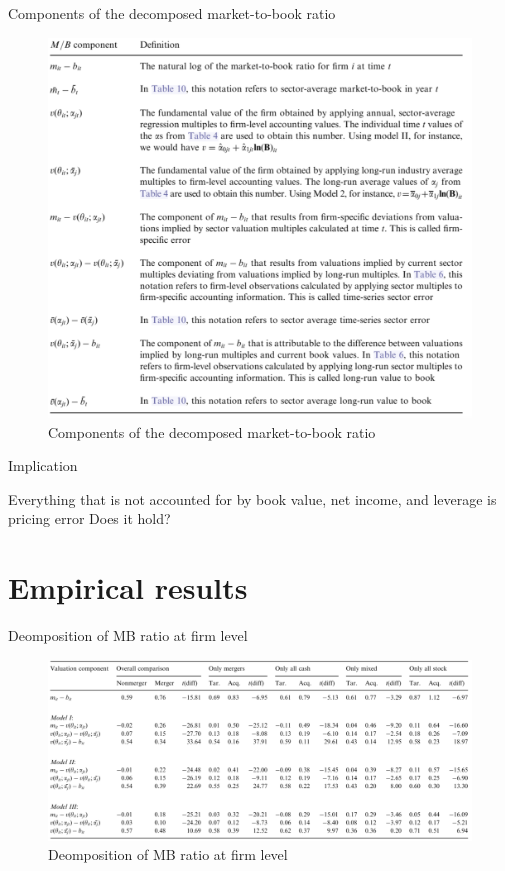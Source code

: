 \documentclass[aspectratio=169,xcolor=dvipsnames]{beamer}
\begin{document}
\begin{frame}{Components of the decomposed market-to-book ratio}
    \begin{figure}
        \includegraphics[width=0.55\linewidth]{figures/p2_table5.png}
        \caption{Components of the decomposed market-to-book ratio}
    \end{figure}
\end{frame}


\begin{frame}{Implication}
    \begin{block}{Everything that is not accounted for by book value, net income, and leverage is pricing error}
        Does it hold?

    \end{block}

\end{frame}

\section{Empirical results}

\begin{frame}{Deomposition of MB ratio at firm level}
    \begin{figure}
        \includegraphics[width=1\linewidth]{figures/p2_table6.png}
        \caption{Deomposition of MB ratio at firm level}
    \end{figure}
\end{frame}
\end{document}
